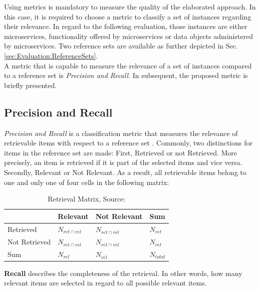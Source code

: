 Using metrics is mandatory to measure the quality of the elaborated approach. In this case, it is required to choose a metric to classify a set of instances regarding their relevance.
In regard to the following evaluation, those instances are either microservices, functionality offered by microservices or data objects administered by microservices. Two reference sets are available as further depicted in Sec.\ref{sec:Evaluation:ReferenceSets}. \\
A metric that is capable to measure the relevance of a set of instances compared to a reference set is \textit{Precision and Recall}. In subsequent, the proposed metric is briefly presented.

\subsection{Precision and Recall}
\label{sec:Evaluation:Metrics:sPrecRecall}
\textit{Precision and Recall} is a classification metric that measures the relevance of retrievable items with respect to a reference set \cite{PrecisionRecall}. Commonly, two distinctions for items in the reference set are made: First, Retrieved or not Retrieved. More precisely, an item is retrieved if it is part of the selected items and vice versa. Secondly, Relevant or Not Relevant. As a result, all retrievable items belong to one and only one of four cells in the following matrix:


\begin{table}[!h]
	\centering
	\begin{tabular}{|l||l|l|l|}
		\hline
		& Relevant & Not Relevant & Sum \\ \hline
		Retrieved     &     $N_{ret\cap rel}$     &     $N_{ret\cap \overline{rel}}$            &     $N_{ret}$  \\ \hline
		Not Retrieved &      $N_{\overline{ret}\cap rel}$      &      $N_{\overline{ret}\cap \overline{rel}}$          &    $N_{\overline{ret}}$   \\\hline
		Sum           &         $N_{rel}$   &      $N_{\overline{rel}}$          &    $N_{total}$   \\ \hline
		
	\end{tabular}
\caption{Retrieval Matrix, Source: \cite{PrecisionRecall}}
    \label{tab:PrecRecall}
    
\end{table}


\noindent
\textbf{Recall} describes the completeness of the retrieval. In other words, how many relevant items are selected in regard to all possible relevant items.

